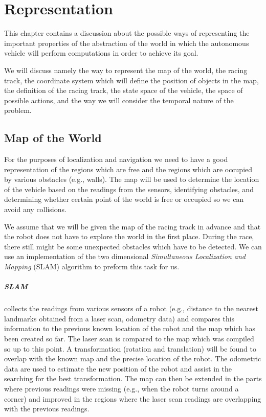 \chapter{Representation}

This chapter contains a discussion about the possible ways of representing the important properties of the abstraction of the world in which the autonomous vehicle will perform computations in order to achieve its goal.

We will discuss namely the way to represent the map of the world, the racing track, the coordinate system which will define the position of objects in the map, the definition of the racing track, the state space of the vehicle, the space of possible actions, and the way we will consider the temporal nature of the problem.

\section{Map of the World}

For the purposes of localization and navigation we need to have a good representation of the regions which are free and the regions which are occupied by various obstacles (e.g., walls). The map will be used to determine the location of the vehicle based on the readings from the sensors, identifying obstacles, and determining whether certain point of the world is free or occupied so we can avoid any collisions.

We assume that we will be given the map of the racing track in advance and that the robot does not have to explore the world in the first place. During the race, there still might be some unexpected obstacles which have to be detected. We can use an implementation of the two dimensional \textit{Simultaneous Localization and Mapping} (SLAM) algorithm \cite{SLAM} to preform this task for us.

\paragraph{SLAM} collects the readings from various sensors of a robot (e.g., distance to the nearest landmarks obtained from a laser scan, odometry data) and compares this information to the previous known location of the robot and the map which has been created so far. The laser scan is compared to the map which was compiled so up to this point. A transformation (rotation and translation) will be found to overlap with the known map and the precise location of the robot. The odometric data are used to estimate the new position of the robot and assist in the searching for the best transformation. The map can then be extended in the parts where previous readings were missing (e.g., when the robot turns around a corner) and improved in the regions where the laser scan readings are overlapping with the previous readings.


